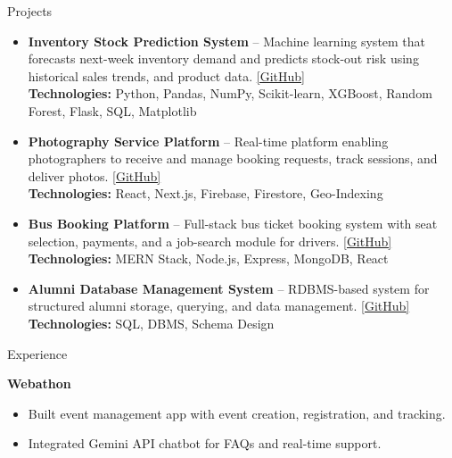 \documentclass{resume}
\begin{document}
\begin{rSection}{Projects}
\begin{itemize}[leftmargin=*]

\item 
\textbf{Inventory Stock Prediction System} – Machine learning system that forecasts next-week inventory demand and predicts stock-out risk using historical sales trends, and product data.
\hfill \href{https://github.com/Aakruthi88/Stock-Prediction}{[GitHub]} \\
\textbf{Technologies:} Python, Pandas, NumPy, Scikit-learn, XGBoost, Random Forest, Flask, SQL, Matplotlib


\item 
\textbf{Photography Service Platform} – Real-time platform enabling photographers to receive and manage booking requests, track sessions, and deliver photos.
\hfill \href{https://github.com/devaamsh2006/reelstudios}{[GitHub]} \\
\textbf{Technologies:} React, Next.js, Firebase, Firestore, Geo-Indexing

\item 
\textbf{Bus Booking Platform} – Full-stack bus ticket booking system with seat selection, payments, and a job-search module for drivers.
\hfill \href{https://github.com/devaamsh2006/bus-booking-app}{[GitHub]} \\
\textbf{Technologies:} MERN Stack, Node.js, Express, MongoDB, React

\item 
\textbf{Alumni Database Management System} – RDBMS-based system for structured alumni storage, querying, and data management.
\hfill \href{https://github.com/devaamsh2006}{[GitHub]} \\
\textbf{Technologies:} SQL, DBMS, Schema Design

\end{itemize}
\end{rSection}




\begin{rSection}{Experience}

\textbf{Webathon}
\begin{itemize}
\item Built event management app with event creation, registration, and tracking.
\item Integrated Gemini API chatbot for FAQs and real-time support.
\end{itemize}

\end{rSection}
\end{document}
